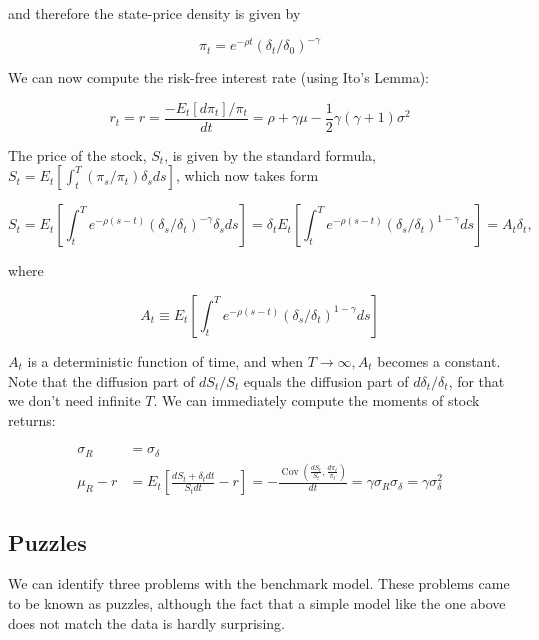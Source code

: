 \documentclass[\topdir/lecture\_notes.tex]{subfiles}
\begin{document}
and therefore the state-price density is given by

\begin{equation}
\pi_{t}=e^{-\rho t}\left(\delta_{t} / \delta_{0}\right)^{-\gamma}
\end{equation}

We can now compute the risk-free interest rate (using Ito's Lemma):

\begin{equation}
r_{t}=r=\frac{-E_{t}\left[d \pi_{t}\right] / \pi_{t}}{d t}=\rho+\gamma \mu-\frac{1}{2} \gamma(\gamma+1) \sigma^{2} \label{eq:9.1.1}
\end{equation}

The price of the stock, $S_{t}$, is given by the standard formula, $S_{t}=E_{t}\left[\int_{t}^{T}\left(\pi_{s} / \pi_{t}\right) \delta_{s} d s\right]$, which now takes form

\begin{equation}
S_{t}=E_{t}\left[\int_{t}^{T} e^{-\rho(s-t)}\left(\delta_{s} / \delta_{t}\right)^{-\gamma} \delta_{s} d s\right]=\delta_{t} E_{t}\left[\int_{t}^{T} e^{-\rho(s-t)}\left(\delta_{s} / \delta_{t}\right)^{1-\gamma} d s\right]=A_{t} \delta_{t}, \label{eq:9.1.2}
\end{equation}

where

\begin{equation}
A_{t} \equiv E_{t}\left[\int_{t}^{T} e^{-\rho(s-t)}\left(\delta_{s} / \delta_{t}\right)^{1-\gamma} d s\right]
\end{equation}

$A_{t}$ is a deterministic function of time, and when $T \rightarrow \infty, A_{t}$ becomes a constant. Note that the diffusion part of $d S_{t} / S_{t}$ equals the diffusion part of $d \delta_{t} / \delta_{t}$, for that we don't need infinite $T$. We can immediately compute the moments of stock returns:

\begin{align}
\sigma_{R} & =\sigma_{\delta}  \label{eq:9.1.3}\\
\mu_{R}-r & =E_{t}\left[\frac{d S_{t}+\delta_{t} d t}{S_{t} d t}-r\right]=-\frac{\operatorname{Cov}\left(\frac{d S_{t}}{S_{t}}, \frac{d \pi_{t}}{\pi_{t}}\right)}{d t}=\gamma \sigma_{R} \sigma_{\delta}=\gamma \sigma_{\delta}^{2}
\label{eq:9.1.4}
\end{align}

\subsection{Puzzles}
We can identify three problems with the benchmark model. These problems came to be known as puzzles, although the fact that a simple model like the one above does not match the data is hardly surprising.
\end{document}
